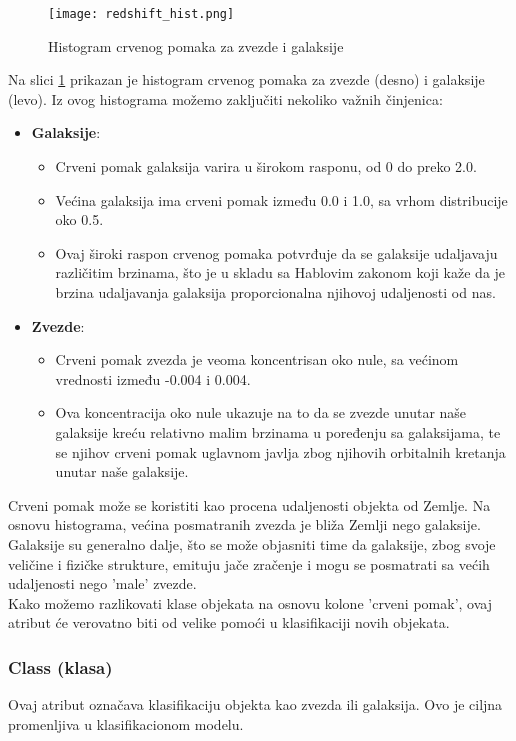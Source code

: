 \documentclass[a4paper,12pt]{article}
\begin{document}
\begin{figure}[H]
\centering
\texttt{[image: redshift\_hist.png]}
\caption{Histogram crvenog pomaka za zvezde i galaksije}
\label{fig:redshift_hist}
\end{figure}

Na slici \ref{fig:redshift_hist} prikazan je histogram crvenog pomaka za zvezde (desno) i galaksije (levo). Iz ovog histograma možemo zaključiti nekoliko važnih činjenica:

\begin{itemize}
    \item \textbf{Galaksije}: 
    \begin{itemize}
        \item Crveni pomak galaksija varira u širokom rasponu, od 0 do preko 2.0.
        \item Većina galaksija ima crveni pomak između 0.0 i 1.0, sa vrhom distribucije oko 0.5.
        \item Ovaj široki raspon crvenog pomaka potvrđuje da se galaksije udaljavaju različitim brzinama, što je u skladu sa Hablovim zakonom koji kaže da je brzina udaljavanja galaksija proporcionalna njihovoj udaljenosti od nas.
    \end{itemize}
    \item \textbf{Zvezde}: 
    \begin{itemize}
        \item Crveni pomak zvezda je veoma koncentrisan oko nule, sa većinom vrednosti između -0.004 i 0.004.
        \item Ova koncentracija oko nule ukazuje na to da se zvezde unutar naše galaksije kreću relativno malim brzinama u poređenju sa galaksijama, te se njihov crveni pomak uglavnom javlja zbog njihovih orbitalnih kretanja unutar naše galaksije.
    \end{itemize}
\end{itemize}
Crveni pomak može se koristiti kao procena udaljenosti objekta od Zemlje. Na osnovu histograma, većina posmatranih zvezda je bliža Zemlji nego galaksije. Galaksije su generalno dalje, što se može objasniti time da galaksije, zbog svoje veličine i fizičke strukture, emituju jače zračenje i mogu se posmatrati sa većih udaljenosti nego 'male' zvezde.
\\Kako možemo razlikovati klase objekata na osnovu kolone 'crveni pomak', ovaj atribut će verovatno biti od velike pomoći u klasifikaciji novih objekata.

\subsubsection{Class (klasa)}
Ovaj atribut označava klasifikaciju objekta kao zvezda ili galaksija. Ovo je ciljna promenljiva u klasifikacionom modelu.
\end{document}
